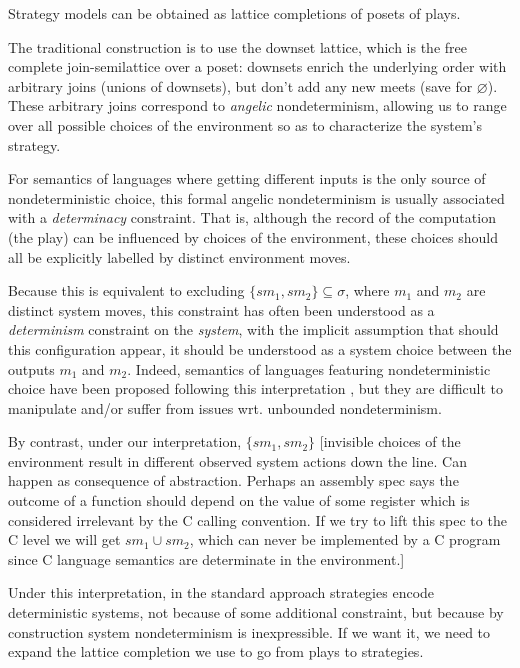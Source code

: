 \documentclass[format=sigplan,authordraft]{acmart}
\begin{document}
Strategy models can be obtained as
lattice completions of posets of plays.

The traditional construction is to use the downset lattice,
which is the free complete join-semilattice over a poset:
downsets enrich the underlying order
with arbitrary joins (unions of downsets),
but don't add any new meets (save for $\varnothing$).
These arbitrary joins correspond to \emph{angelic} nondeterminism,
allowing us to range over all possible choices of the environment
so as to characterize the system's strategy.

For semantics of languages
where getting different inputs is the only source of
nondeterministic choice,
this formal angelic nondeterminism is usually associated with
a \emph{determinacy} constraint.
That is,
although the record of the computation (the play)
can be influenced by choices of the environment,
these choices should all be explicitly labelled
by distinct environment moves.

Because this is equivalent to excluding
$\{ s m_1, s m_2 \} \subseteq \sigma$,
where $m_1$ and $m_2$ are distinct system moves,
this constraint has often been understood
as a \emph{determinism} constraint on the \emph{system},
with the implicit assumption that
should this configuration appear,
it should be understood as
a system choice between the outputs $m_1$ and $m_2$.
Indeed,
semantics of languages featuring nondeterministic choice
have been proposed following this interpretation \cite{gsnondet},
but they are difficult to manipulate
and/or suffer from issues wrt. unbounded nondeterminism.

By contrast,
under our interpretation,
$\{ s m_1, s m_2 \}$
[invisible choices of the environment
result in different observed system actions down the line.
Can happen as consequence of abstraction.
Perhaps an assembly spec says
the outcome of a function should depend on the value of some
register which is considered irrelevant by the C calling convention.
If we try to lift this spec to the C level
we will get $s m_1 \cup s m_2$,
which can never be implemented by a C program
since C language semantics are determinate in the environment.]

Under this interpretation,
in the standard approach strategies encode deterministic systems,
not because of some additional constraint,
but because by construction system nondeterminism is inexpressible.
If we want it,
we need to expand the lattice completion we use
to go from plays to strategies.

\end{document}
